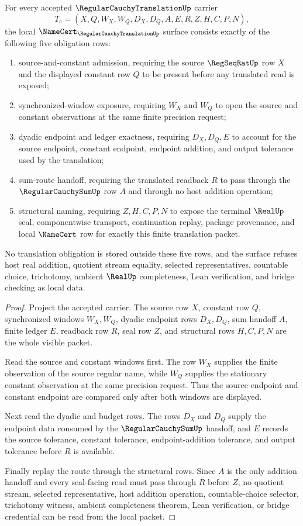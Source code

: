 \begin{theorem}
\label{thm:regular-cauchy-translation-namecert-obligations}
For every accepted $\RegularCauchyTranslationUp$ carrier
$$
T_c=(X,Q,W_X,W_Q,D_X,D_Q,A,E,R,Z,H,C,P,N),
$$
the local $\NameCert_{\RegularCauchyTranslationUp}$ surface consists exactly of the following five obligation rows:
\begin{enumerate}
\item source-and-constant admission, requiring the source $\RegSeqRatUp$ row $X$ and the displayed constant row $Q$ to be present before any translated read is exposed;
\item synchronized-window exposure, requiring $W_X$ and $W_Q$ to open the source and constant observations at the same finite precision request;
\item dyadic endpoint and ledger exactness, requiring $D_X,D_Q,E$ to account for the source endpoint, constant endpoint, endpoint addition, and output tolerance used by the translation;
\item sum-route handoff, requiring the translated readback $R$ to pass through the $\RegularCauchySumUp$ row $A$ and through no host addition operation;
\item structural naming, requiring $Z,H,C,P,N$ to expose the terminal $\RealUp$ seal, componentwise transport, continuation replay, package provenance, and local $\NameCert$ row for exactly this finite translation packet.
\end{enumerate}
No translation obligation is stored outside these five rows, and the surface refuses host real addition, quotient stream equality, selected representatives, countable choice, trichotomy, ambient $\RealUp$ completeness, Lean verification, and bridge checking as local data.
\end{theorem}
\begin{proof}
Project the accepted carrier. The source row $X$, constant row $Q$, synchronized windows $W_X,W_Q$, dyadic endpoint rows $D_X,D_Q$, sum handoff $A$, finite ledger $E$, readback row $R$, seal row $Z$, and structural rows $H,C,P,N$ are the whole visible packet.

Read the source and constant windows first. The row $W_X$ supplies the finite observation of the source regular name, while $W_Q$ supplies the stationary constant observation at the same precision request. Thus the source endpoint and constant endpoint are compared only after both windows are displayed.

Next read the dyadic and budget rows. The rows $D_X$ and $D_Q$ supply the endpoint data consumed by the $\RegularCauchySumUp$ handoff, and $E$ records the source tolerance, constant tolerance, endpoint-addition tolerance, and output tolerance before $R$ is available.

Finally replay the route through the structural rows. Since $A$ is the only addition handoff and every seal-facing read must pass through $R$ before $Z$, no quotient stream, selected representative, host addition operation, countable-choice selector, trichotomy witness, ambient completeness theorem, Lean verification, or bridge credential can be read from the local packet.
\end{proof}

